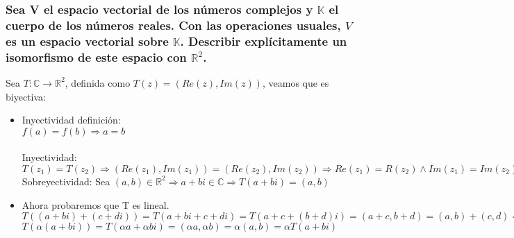 \documentclass{article}
\begin{document}
\subsubsection{Sea V el espacio vectorial de los números complejos y $\mathbb{K}$ el cuerpo de los números reales.
Con las operaciones usuales, $V$ es un espacio vectorial sobre $\mathbb{K}$. Describir explícitamente un isomorfismo
de este espacio con $\mathbb{R}^2$.}
Sea $T: \mathbb{C} \rightarrow \mathbb{R}^2$, definida como $T(z) = (Re(z),Im(z))$, veamos que es biyectiva:
\begin{itemize}
\item
	Inyectividad definición: \\
	$f(a) = f(b) \Rightarrow a=b$ \\ \\
	Inyectividad: $T(z_1)=T(z_2) \Rightarrow (Re(z_1),Im(z_1)) = (Re(z_2),Im(z_2)) \Rightarrow
	Re(z_1) = R(z_2) \wedge Im(z_1) = Im(z_2) \Rightarrow z_1 = z_2$ \\
	Sobreyectividad: 
	Sea $(a,b) \in \mathbb{R}^2 \Rightarrow a+bi \in \mathbb{C} \Rightarrow T(a+bi) = (a,b)$
\item
	Ahora probaremos que T es lineal. \\
	$T((a+bi)+(c+di)) = T(a+bi+c+di) = T(a+c+(b+d)i) = (a+c,b+d) = (a,b)+(c,d) = T(a+bi)+T(c+di)$ \\
	$T(\alpha (a+bi)) = T(\alpha a + \alpha bi) = (\alpha a, \alpha b) = \alpha (a,b) = \alpha T(a+bi)$
\end{itemize}
\end{document}
